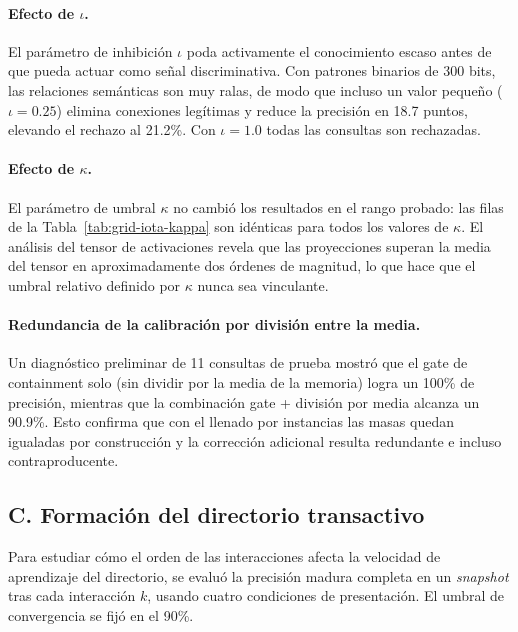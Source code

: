 \paragraph{Efecto de $\iota$.}
El parámetro de inhibición $\iota$ poda activamente el conocimiento escaso antes de que pueda actuar como señal discriminativa.
Con patrones binarios de 300 bits, las relaciones semánticas son muy ralas, de modo que incluso un valor pequeño ($\iota = 0.25$) elimina conexiones legítimas y reduce la precisión en 18.7 puntos, elevando el rechazo al 21.2\%.
Con $\iota = 1.0$ todas las consultas son rechazadas.

\paragraph{Efecto de $\kappa$.}
El parámetro de umbral $\kappa$ no cambió los resultados en el rango probado: las filas de la Tabla~\ref{tab:grid-iota-kappa} son idénticas para todos los valores de $\kappa$.
El análisis del tensor de activaciones revela que las proyecciones superan la media del tensor en aproximadamente dos órdenes de magnitud, lo que hace que el umbral relativo definido por $\kappa$ nunca sea vinculante.

\paragraph{Redundancia de la calibración por división entre la media.}
Un diagnóstico preliminar de 11 consultas de prueba mostró que el gate de containment solo (sin dividir por la media de la memoria) logra un 100\% de precisión, mientras que la combinación gate + división por media alcanza un 90.9\%.
Esto confirma que con el llenado por instancias las masas quedan igualadas por construcción y la corrección adicional resulta redundante e incluso contraproducente.

\subsection{C. Formación del directorio transactivo}
\label{sec:formacion}

Para estudiar cómo el orden de las interacciones afecta la velocidad de aprendizaje del directorio, se evaluó la precisión madura completa en un \textit{snapshot} tras cada interacción $k$, usando cuatro condiciones de presentación.
El umbral de convergencia se fijó en el 90\%.

